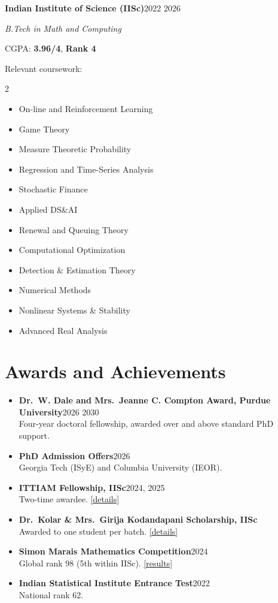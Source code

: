 \documentclass[11pt,letterpaper]{article}
\newcommand{\entry}[2]{\needspace{6\baselineskip}\textbf{#1}\hfill #2\par}
\newcommand{\sub}[2]{{\itshape #1}\hfill{#2}\par}
\newcommand{\award}[3]{\item \textbf{#1}\hfill #2\\ #3}
\newcommand{\gap}{\vspace{8pt}}
\begin{document}
\gap
\entry{Indian Institute of Science (IISc)}{2022 \textendash{} 2026}
\sub{B.Tech in Math and Computing}{}
CGPA: \textbf{3.96/4}, \textbf{Rank 4}\par
\vspace{5pt}
Relevant coursework:
\begin{multicols}{2}
\begin{itemize}[itemsep=0pt, topsep=1pt]
  \item On-line and Reinforcement Learning
  \item Game Theory
  \item Measure Theoretic Probability
  \item Regression and Time-Series Analysis
  \item Stochastic Finance
  \item Applied DS\&AI
  \item Renewal and Queuing Theory
  \item Computational Optimization
  \item Detection \& Estimation Theory
  \item Numerical Methods
  \item Nonlinear Systems \& Stability
  \item Advanced Real Analysis
\end{itemize}
\end{multicols}

\section*{Awards and Achievements}
\begin{itemize}[itemsep=4pt]
  \award{Dr.~W. Dale and Mrs.~Jeanne C. Compton Award, Purdue University}{2026 \textendash{} 2030}
        {Four-year doctoral fellowship, awarded over and above standard PhD support.}
  \award{PhD Admission Offers}{2026}
        {Georgia Tech (ISyE) and Columbia University (IEOR).}
  \award{ITTIAM Fellowship, IISc}{2024, 2025\textendash26}
        {Two-time awardee.
        \href{https://odaa.iisc.ac.in/ittiam-btech-fellowship/}{[details]}}
  \award{Dr.~Kolar \& Mrs.~Girija Kodandapani Scholarship, IISc}{}
        {Awarded to one student per batch.
        \href{https://odaa.iisc.ac.in/kodandapani-family-fellowship/}{[details]}}
  \award{Simon Marais Mathematics Competition}{2024}
        {Global rank 98 (5th within IISc).
        \href{https://www.simonmarais.org/east-division1.html}{[results]}}
  \award{Indian Statistical Institute Entrance Test}{2022}
        {National rank 62.}
\end{itemize}
\end{document}
